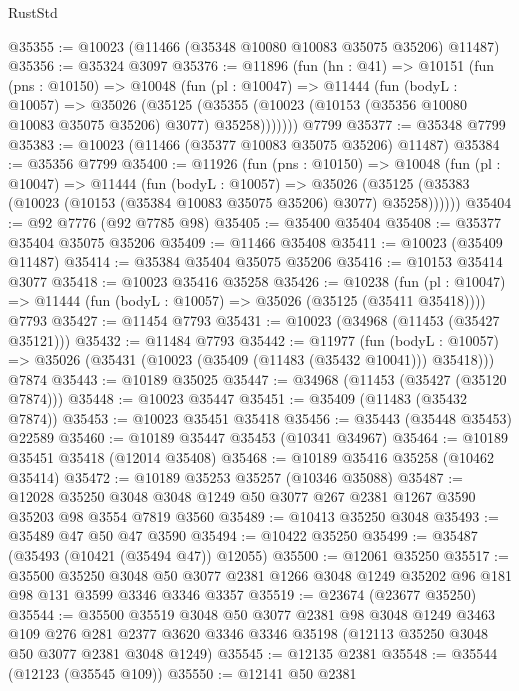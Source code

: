 \begin{lexlean}{RustStd}
\begin{coremodule}
@35355 := @10023 (@11466 (@35348 @10080 @10083 @35075 @35206) @11487)
@35356 := @35324 @3097
@35376 := @11896
    (fun (hn : @41) =>
    @10151
      (fun (pns : @10150) =>
      @10048
        (fun (pl : @10047) =>
        @11444
          (fun (bodyL : @10057) =>
          @35026
            (@35125
              (@35355 (@10023 (@10153 (@35356 @10080 @10083 @35075 @35206) @3077) @35258)))))))
    @7799
@35377 := @35348 @7799
@35383 := @10023 (@11466 (@35377 @10083 @35075 @35206) @11487)
@35384 := @35356 @7799
@35400 := @11926
    (fun (pns : @10150) =>
    @10048
      (fun (pl : @10047) =>
      @11444
        (fun (bodyL : @10057) =>
        @35026 (@35125 (@35383 (@10023 (@10153 (@35384 @10083 @35075 @35206) @3077) @35258))))))
@35404 := @92 @7776 (@92 @7785 @98)
@35405 := @35400 @35404
@35408 := @35377 @35404 @35075 @35206
@35409 := @11466 @35408
@35411 := @10023 (@35409 @11487)
@35414 := @35384 @35404 @35075 @35206
@35416 := @10153 @35414 @3077
@35418 := @10023 @35416 @35258
@35426 := @10238
    (fun (pl : @10047) => @11444 (fun (bodyL : @10057) => @35026 (@35125 (@35411 @35418))))
    @7793
@35427 := @11454 @7793
@35431 := @10023 (@34968 (@11453 (@35427 @35121)))
@35432 := @11484 @7793
@35442 := @11977
    (fun (bodyL : @10057) => @35026 (@35431 (@10023 (@35409 (@11483 (@35432 @10041))) @35418)))
    @7874
@35443 := @10189 @35025
@35447 := @34968 (@11453 (@35427 (@35120 @7874)))
@35448 := @10023 @35447
@35451 := @35409 (@11483 (@35432 @7874))
@35453 := @10023 @35451 @35418
@35456 := @35443 (@35448 @35453) @22589
@35460 := @10189 @35447 @35453 (@10341 @34967)
@35464 := @10189 @35451 @35418 (@12014 @35408)
@35468 := @10189 @35416 @35258 (@10462 @35414)
@35472 := @10189 @35253 @35257 (@10346 @35088)
@35487 := @12028
    @35250
    @3048
    @3048
    @1249
    @50
    @3077
    @267
    @2381
    @1267
    @3590
    @35203
    @98
    @3554
    @7819
    @3560
@35489 := @10413 @35250 @3048
@35493 := @35489 @47 @50 @47 @3590
@35494 := @10422 @35250
@35499 := @35487 (@35493 (@10421 (@35494 @47)) @12055)
@35500 := @12061 @35250
@35517 := @35500
    @35250
    @3048
    @50
    @3077
    @2381
    @1266
    @3048
    @1249
    @35202
    @96
    @181
    @98
    @131
    @3599
    @3346
    @3346
    @3357
@35519 := @23674 (@23677 @35250)
@35544 := @35500
    @35519
    @3048
    @50
    @3077
    @2381
    @98
    @3048
    @1249
    @3463
    @109
    @276
    @281
    @2377
    @3620
    @3346
    @3346
    @35198
    (@12113 @35250 @3048 @50 @3077 @2381 @3048 @1249)
@35545 := @12135 @2381
@35548 := @35544 (@12123 (@35545 @109))
@35550 := @12141 @50 @2381

\end{coremodule}
\end{lexlean}
